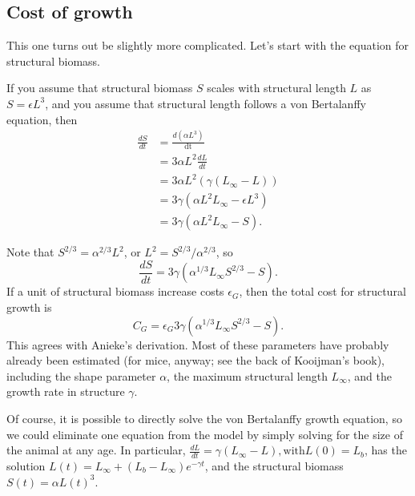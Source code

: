 \documentclass[12pt,reqno,final,pdftex]{amsart}\usepackage[]{graphicx}\usepackage[]{color}
\theoremstyle{plain}
\numberwithin{equation}{part}
\begin{document}
\subsection*{Cost of growth}
This one turns out be slightly more complicated.
Let's start with the equation for structural biomass.

If you assume that structural biomass $S$ scales with structural length $L$ as $S =\epsilon L^3$, and you assume that structural length
follows a von Bertalanffy equation, then
\begin{align}
\frac{dS}{dt} &=\frac{d\left(\alpha L^3\right)}{\text{dt}} \\
& =3\alpha  L^2 \frac{dL}{dt} \\
& =3 \alpha  L^2 \left(\gamma \left(L_{\infty}-L\right)\right) \\
& =3 \gamma \left(\alpha  L^2 L_{\infty}-\epsilon  L^3\right) \\
& =3 \gamma \left(\alpha  L^2L_{\infty }-S\right).
\end{align}

Note that $S^{2/3}=\alpha^{2/3}L^2$, or $L^2=S^{2/3}/\alpha^{2/3}$, so
\begin{equation}
\frac{dS}{dt}=3\gamma  \left(\alpha^{1/3}L_{\infty }S^{2/3}-S\right).
\end{equation}
If a unit of structural biomass increase costs $\epsilon_G$, then the total cost for structural growth is
\begin{equation}
C_G = \epsilon _G 3\gamma  \left(\alpha ^{1/3}L_{\infty }S^{2/3}-S\right).
\end{equation}
This agrees with Anieke's derivation.
Most of these parameters have probably already been estimated (for mice, anyway; see the back of Kooijman's book), including the shape parameter $\alpha$, the maximum structural length $L_{\infty }$, and the growth rate in structure $\gamma$.

Of course, it is possible to directly solve the von Bertalanffy growth equation, so we could eliminate one equation from the model by simply solving for the size of the animal at any age.
In particular, $\frac{dL}{dt}=\gamma \left(L_{\infty }-L\right), \text{with} L(0)=L_b$, has the solution $L(t)=L_{\infty }+\left(L_b-L_{\infty}\right)e^{-\gamma t}$, and the structural biomass $S(t)=\alpha L(t)^3$.
\end{document}
